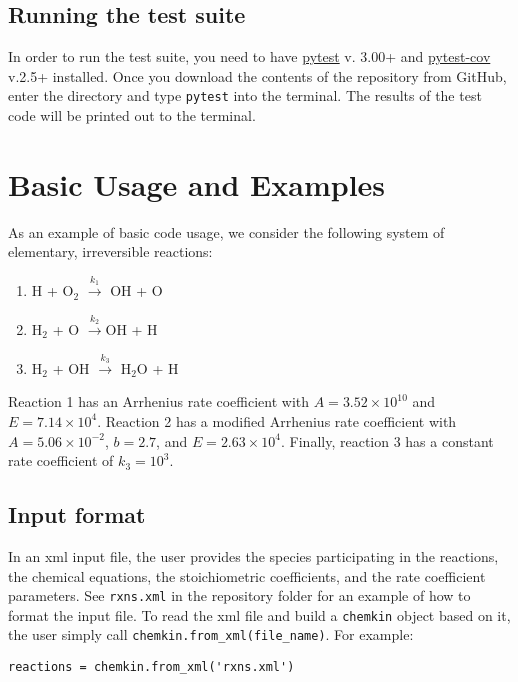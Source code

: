 \documentclass[12pt]{article}
\begin{document}
\subsection{Running the test suite}
In order to run the test suite, you need to have \href{https://docs.pytest.org/en/latest/}{pytest} v. 3.00+ and \href{https://pypi.python.org/pypi/pytest-cov}{pytest-cov} v.2.5+ installed. Once you download the contents of the repository from GitHub, enter the directory and type {\tt pytest} into the terminal. The results of the test code will be printed out to the terminal. 
  
\section{Basic Usage and Examples}
As an example of basic code usage, we consider the following system of elementary, irreversible reactions:

\begin{enumerate}
\item H + O$_2$ $\overset{k_1}{\rightarrow}$ OH + O 
\item H$_2$ + O $\overset{k_2}{\rightarrow}$OH + H  
\item H$_2$ + OH $\overset{k_3}{\rightarrow}$ H$_2$O + H 
\end{enumerate}

Reaction 1 has an Arrhenius rate coefficient with $A = 3.52\times 10^{10}$ and $E = 7.14\times 10^4$. Reaction 2 has a modified Arrhenius rate coefficient with $A = 5.06\times 10^{-2}$, $b = 2.7$, and $E = 2.63\times10^4$. Finally, reaction 3 has a constant rate coefficient of $k_3 = 10^3$. 



\subsection{Input format}
In an xml input file, the user provides the species participating in the reactions, the chemical equations, the stoichiometric coefficients, and the rate coefficient parameters. See {\tt rxns.xml} in the repository folder for an example of how to format the input file. To read the xml file and build a {\tt chemkin} object based on it, the user simply call {\tt chemkin.from\_xml(file\_name)}. For example:

\begin{lstlisting}
reactions = chemkin.from_xml('rxns.xml')
\end{lstlisting}
\end{document}
